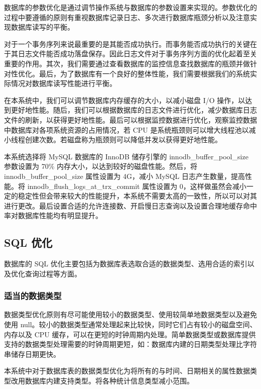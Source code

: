 数据库的参数优化\cite{schwartz2012high}是通过调节操作系统与数据库的参数设置来实现的。参数优化的过程中要遵循的原则有重视数据库记录日志、多次进行数据库瓶颈分析以及注意实现数据库读写的平衡。

对于一个事务序列来说最重要的是其能否成功执行。而事务能否成功执行的关键在于其日志文件能否成功落盘保存。因此日志文件对于事务序列方面的优化起着至关重要的作用。其次，我们需要通过查看数据库的监控信息查找数据库的瓶颈并做针对性优化。最后，为了数据库有一个良好的整体性能，我们需要根据我们的系统实际情况对数据库读写性能进行平衡。

在本系统中，我们可以调节数据库内存缓存的大小，以减小磁盘 I/O 操作，以达到更好地性能。随后，我们可以根据数据库的日志文件进行优化，减少数据库日志文件的刷新，以获得更好地性能。最后可以根据监控数据进行优化，观察监控数据中数据库对各项系统资源的占用情况，若 CPU 是系统瓶颈则可以增大线程池以减小线程创建次数。若磁盘称为瓶颈则可以降低并发以获得更好地性能。

本系统选择将 MySQL 数据库的 InnoDB\cite{姜承尧2011mysql} 储存引擎的 innodb\_buffer\_pool\_size 参数设置为 70\% 内存大小，以达到较好的磁盘性能。然后，将 innodb\_buffer\_pool\_size 属性设置为 4G，减小 MySQL 日志产生数量，提高性能。将 innodb\_flush\_logs\_at\_trx\_commit 属性设置为 0，这样做虽然会减小一定的稳定性但会带来较大的性能提升，本系统不需要太高的一致性，所以可以对其进行更改。最后设置合适的允许连接数、开启慢日志查询以及设置合理地缓存命中率对数据库性能均有明显提升。


\subsection{SQL 优化}

数据库的 SQL 优化主要包括为数据库表选取合适的数据类型、选用合适的索引以及优化查询过程等方面。

\subsubsection{适当的数据类型}

数据类型优化原则有尽可能使用较小的数据类型、使用较简单地数据类型以及避免使用 null。较小的数据类型通常处理起来比较快，同时它们占有较小的磁盘空间、内存以及 CPU 缓存，可以在更短的时钟周期内处理。简单数据类型或数据库提供支持的数据类型处理需要的时钟周期更短，如：数据库内建的日期类型处理比字符串储存日期更快。

本系统中对于数据库表的数据类型优化为将所有的与时间、日期相关的属性数据类型改用数据库内建支持类型。将各种统计信息类型减小范围。

